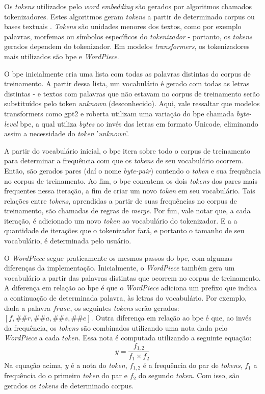 Os \textit{tokens} utilizados pelo \textit{word embedding} são gerados por algoritmos chamados tokenizadores. Estes algoritmos geram \textit{tokens} a partir de determinado corpus ou bases textuais \cite{Mielke2021BetweenWA}. \textit{Tokens} são unidades menores dos textos, como por exemplo palavras, morfemas ou símbolos específicos do \textit{tokenizador} - portanto, os \textit{tokens} gerados dependem do tokenizador. Em modelos \textit{transformers}, os tokenizadores mais utilizados são \gls{bpe} e \textit{WordPiece}.

O \gls{bpe} inicialmente cria uma lista com todas as palavras distintas do corpus de treinamento. A partir dessa lista, um vocabulário é gerado com todas as letras distintas - e textos com palavras que não estavam no corpus de treinamento serão substituídos pelo token \textit{unknown} (desconhecido). Aqui, vale ressaltar que modelos transformers como \gls{gpt2} e \gls{roberta} utilizam uma variação do \gls{bpe} chamada \textit{byte-level} \gls{bpe}, a qual utiliza \textit{bytes} ao invés das letras em formato Unicode, eliminando assim a necessidade do \textit{token} '\textit{unknown}'.

A partir do vocabulário inicial, o \gls{bpe} itera sobre todo o corpus de treinamento para determinar a frequência com que os \textit{tokens} de seu vocabulário ocorrem. Então, são gerados pares (daí o nome \textit{byte-pair}) contendo o \textit{token} e sua frequência no corpus de treinamento. Ao fim, o \gls{bpe} concatena os dois \textit{tokens} dos pares mais frequentes nessa iteração, a fim de criar um novo \textit{token} em seu vocabulário. Tais relações entre \textit{tokens}, aprendidas a partir de suas frequências no corpus de treinamento, são chamadas de regras de \textit{merge}. Por fim, vale notar que, a cada iteração, é adicionado um novo \textit{token} ao vocabulário do tokenizador. E a a quantidade de iterações que o tokenizador fará, e portanto o tamanho de seu vocabulário, é determinada pelo usuário.

O \textit{WordPiece} segue praticamente os mesmos passos do \gls{bpe}, com algumas diferenças da implementação. Inicialmente, o \textit{WordPiece} também gera um vocabulário a partir das palavras distintas que ocorrem no corpus de treinamento. A diferença em relação ao \gls{bpe} é que o \textit{WordPiece} adiciona um prefixo que indica a continuação de determinada palavra, às letras do vocabulário. Por exemplo, dada a palavra $frase$, os seguintes \textit{tokens} serão gerados: $[f, \#\#r, \#\#a, \#\#s, \#\#e]$. Outra diferença em relação ao \gls{bpe} é que, ao invés da frequência, os \textit{tokens} são combinados utilizando uma nota dada pelo \textit{WordPiece} a cada \textit{token}. Essa nota é computada utilizando a seguinte equação:
\begin{equation*}
y=\frac{f_{1,2}}{f_1 \times f_2}
\end{equation*}
Na equação acima, $y$ é a nota do \textit{token}, $f_{1,2}$ é a frequência do par de \textit{tokens}, $f_1$ a frequência do o primeiro \textit{token} do par e $f_2$ do segundo \textit{token}. Com isso, são gerados os \textit{tokens} de determinado corpus.

